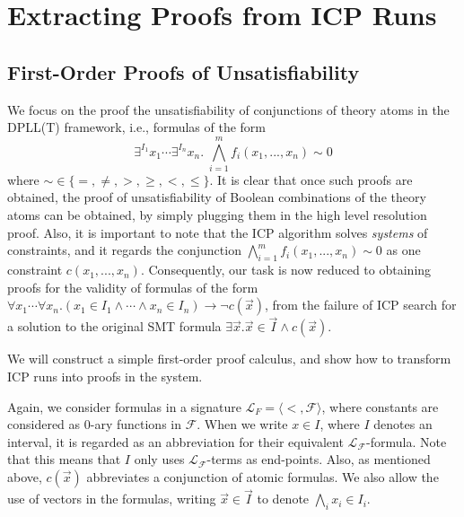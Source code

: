 \documentclass{llncs}
\begin{document}
\section{Extracting Proofs from ICP Runs}\label{icp}

\subsection{First-Order Proofs of Unsatisfiability}

We focus on the proof the unsatisfiability of conjunctions of theory
atoms in the DPLL(T) framework, i.e., formulas of the form
$$\exists^{I_1} x_1\cdots \exists^{I_n} x_n.\; \bigwedge_{i=1}^m
f_i(x_1,...,x_n)\sim 0$$
where $\sim \in \{=,\neq, >, \geq, <, \leq\}$. It is clear that once such
proofs are obtained, the proof of unsatisfiability of Boolean combinations of
the theory atoms can be obtained, by simply plugging them in the high level
resolution proof. Also, it is important to note that the ICP algorithm solves
{\em systems} of constraints, and it regards the conjunction $\bigwedge_{i=1}^m
f_i(x_1,...,x_n)\sim 0$ as one constraint $c(x_1,...,x_n)$. Consequently, our
task is now reduced to obtaining proofs for the validity of formulas of the form
$\forall x_1 \cdots \forall x_n.(x_1\in I_1\wedge \cdots \wedge x_n\in I_n
)\rightarrow \neg c(\vec x)$, from the failure of ICP
search for a solution to the original SMT formula $\exists \vec x. \vec x\in
\vec I\wedge c(\vec x)$.

We will construct a simple first-order proof calculus, and show how to
transform ICP runs into proofs in the system.

Again, we consider formulas in a signature $\mathcal{L}_F = \langle <,
\mathcal{F} \rangle$, where constants are considered as 0-ary functions in
$\mathcal{F}$. When we write $x\in I$, where $I$ denotes an
interval, it is regarded as an abbreviation for their
equivalent $\mathcal{L}_\mathcal{F}$-formula. Note that this means that $I$ only
uses $\mathcal{L}_{\mathcal{F}}$-terms as end-points. Also, as mentioned above,
$c(\vec x)$ abbreviates a conjunction of atomic formulas. We also allow the use
of vectors in the formulas, writing $\vec x\in \vec I$ to denote $\bigwedge_i
x_i\in I_i$.
\end{document}
